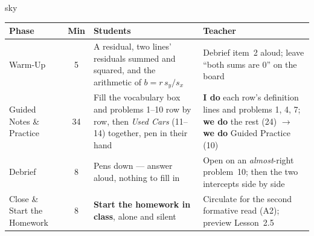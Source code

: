 \documentclass[10pt]{article}
\begin{document}
\boxguard[30]
\begin{skillbox}{sky}
\renewcommand{\arraystretch}{1.25}
\begin{tabularx}{\linewidth}{@{}l c X X@{}}
\textbf{Phase} & \textbf{Min} & \textbf{Students} & \textbf{Teacher} \\
\hline
Warm-Up & 5 & A residual, two lines' residuals summed and squared, and the arithmetic of
$b = r\,s_y/s_x$ & Debrief item~2 aloud; leave ``both sums are 0'' on the board \\
Guided Notes \& Practice & 34 & Fill the vocabulary box and problems 1--10 row by row, then
\emph{Used Cars} (11--14) together, pen in their hand & \textbf{I do} each row's definition lines
and problems 1, 4, 7; \textbf{we do} the rest (24) $\to$ \textbf{we do} Guided Practice (10) \\
Debrief & 8 & Pens down --- answer aloud, nothing to fill in & Open on an \emph{almost}-right
problem~10; then the two intercepts side by side \\
Close \& Start the Homework & 8 & \textbf{Start the homework in class}, alone and silent &
Circulate for the second formative read (A2); preview Lesson~2.5 \\
\end{tabularx}
\end{skillbox}
\end{document}
